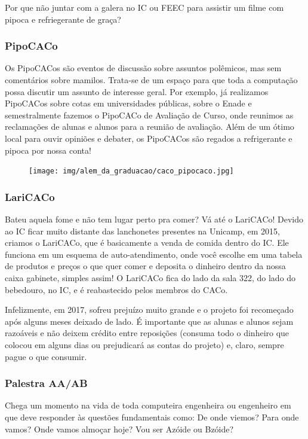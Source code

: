 Por que não juntar com a galera no IC ou FEEC para assistir um filme com pipoca
e refriegerante de graça?

\subsubsection{PipoCACo}

Os PipoCACos são eventos de discussão sobre assuntos polêmicos, mas sem
comentários sobre mamilos. Trata-se de um espaço para que toda a computação
possa discutir um assunto de interesse geral. Por exemplo, já realizamos
PipoCACos sobre cotas em universidades públicas, sobre o Enade e semestralmente
fazemos o PipoCACo de Avaliação de Curso, onde reunimos as reclamações de
alunas e alunos para a reunião de avaliação. Além de um ótimo local para ouvir
opiniões e debater, os PipoCACos são regados a refrigerante e pipoca por nossa
conta!

\begin{figure}[H]
  \centering
  \texttt{[image: img/alem\_da\_graduacao/caco\_pipocaco.jpg]}
\end{figure}

\subsubsection{LariCACo}

Bateu aquela fome e não tem lugar perto pra comer? Vá até o LariCACo! Devido ao
IC ficar muito distante das lanchonetes presentes na Unicamp, em 2015, criamos
o LariCACo, que é basicamente a venda de comida dentro do IC. Ele funciona em
um esquema de auto-atendimento, onde você escolhe em uma tabela de produtos e
preços o que quer comer e deposita o dinheiro dentro da nossa caixa gabinete,
simples assim! O LariCACo fica do lado da sala 322, do lado do bebedouro, no
IC, e é reabastecido pelos membros do CACo.

Infelizmente, em 2017, sofreu prejuízo muito grande e o projeto foi recomeçado
após alguns meses deixado de lado. É importante que as alunas e alunos sejam
razoáveis e não deixem crédito entre reposições (consuma todo o dinheiro que
colocou em alguns dias ou prejudicará as contas do projeto) e, claro, sempre
pague o que consumir.

\subsubsection{Palestra AA/AB}

Chega um momento na vida de toda computeira engenheira ou engenheiro em que
deve responder às questões fundamentais como: De onde viemos? Para onde vamos?
Onde vamos almoçar hoje? Vou ser Azóide ou Bzóide?


